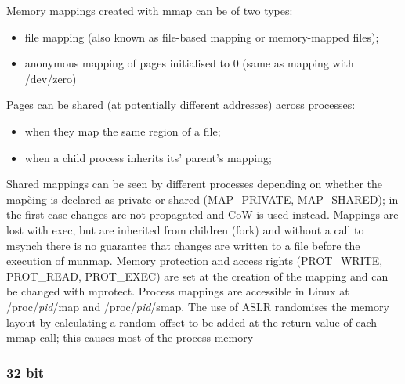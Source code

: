Memory mappings created with {\ttfamily mmap} can be of two types:
\begin{itemize}
    \item file mapping (also known as file-based mapping or memory-mapped files);
    \item anonymous mapping of pages initialised to 0 (same as mapping with /dev/zero)
\end{itemize}
Pages can be shared (at potentially different addresses) across processes:
\begin{itemize}
    \item when they map the same region of a file;
    \item when a child process inherits its' parent's mapping;
\end{itemize}
Shared mappings can be seen by different processes depending on whether the mapèing is declared as private or shared
({\ttfamily MAP\_PRIVATE, MAP\_SHARED}); in the first case changes are not propagated and CoW is used instead.
Mappings are lost with {\ttfamily exec}, but are inherited from children ({\ttfamily fork}) and without a call to
{\ttfamily msynch} there is no guarantee that changes are written to a file before the execution of {\ttfamily munmap}.
Memory protection and access rights ({\ttfamily PROT\_WRITE, PROT\_READ, PROT\_EXEC}) are set at the creation of the
mapping and can be changed with {\ttfamily mprotect}. Process mappings are accessible in Linux at {\ttfamily
/proc/\textit{pid}/map} and {\ttfamily /proc/\textit{pid}/smap}. The use of ASLR randomises the memory layout by
calculating a random offset to be added at the return value of each {\ttfamily mmap} call; this causes most of the
process memory 
\subsubsection{32 bit}
